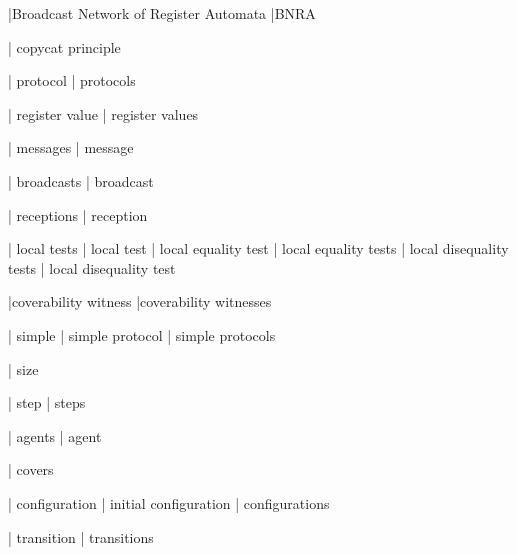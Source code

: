 

|Broadcast Network of Register Automata
|BNRA

| copycat principle

| protocol
| protocols

| register value
| register values

| messages
| message

| broadcasts
| broadcast

| receptions
| reception

| local tests
| local test
| local equality test
| local equality tests
| local disequality tests
| local disequality test

|coverability witness
|coverability witnesses

| simple
| simple protocol
| simple protocols

| size

| step
| steps

| agents
| agent

| covers

| configuration
| initial configuration
| configurations

| transition
| transitions

